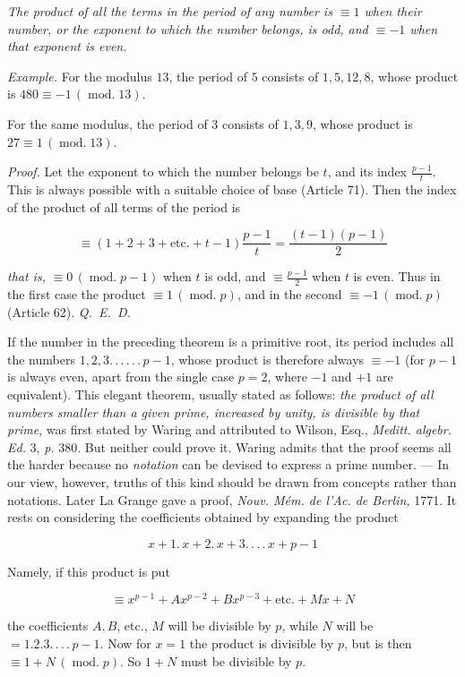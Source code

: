 \emph{The product of all the terms in the period of any number is $\equiv1$ when their number, or the exponent to which the number belongs, is odd, and $\equiv-1$ when that exponent is even.}

\emph{Example.} For the modulus $13$, the period of $5$ consists of $1,5,12,8$, whose product is $480\equiv-1\,(\operatorname{mod.}13)$.

For the same modulus, the period of $3$ consists of $1,3,9$, whose product is $27\equiv1\,(\operatorname{mod.}13)$.

\emph{Proof.} Let the exponent to which the number belongs be $t$, and its index $\frac{p-1}{t}$. This is always possible with a suitable choice of base (Article 71). Then the index of the product of all terms of the period is

\[\equiv(1+2+3+\text{etc.}+t-1)\frac{p-1}{t}=\frac{(t-1)(p-1)}{2}\]

\emph{that is,} $\equiv0\,(\operatorname{mod.}p-1)$ when $t$ is odd, and $\equiv\frac{p-1}{2}$ when $t$ is even. Thus in the first case the product $\equiv1\,(\operatorname{mod.}p)$, and in the second $\equiv-1\,(\operatorname{mod.}p)$ (Article 62). \mbox{\emph{Q. E. D.}}

If the number in the preceding theorem is a primitive root, its period includes all the numbers $1,2,3\mathpunct{.\,.\,.\,.\,.\,.}\,p-1$, whose product is therefore always $\equiv-1$ (for $p-1$ is always even, apart from the single case $p=2$, where $-1$ and $+1$ are equivalent). This elegant theorem, usually stated as follows: \emph{the product of all numbers smaller than a given prime, increased by unity, is divisible by that prime}, was first stated by Waring and attributed to Wilson, Esq., \emph{Meditt. algebr. Ed.} 3, \emph{p.} 380. But neither could prove it. Waring admits that the proof seems all the harder because no \emph{notation} can be devised to express a prime number. --- In our view, however, truths of this kind should be drawn from concepts rather than notations. Later La Grange gave a proof, \emph{Nouv. M\'em. de l'Ac. de Berlin,} 1771. It rests on considering
the coefficients obtained by expanding the product

\[x+1.\,x+2.\,x+3\mathpunct{.\,.\,.\,.}\,x+p-1\]

\noindent Namely, if this product is put

\[\equiv x^{p-1}+Ax^{p-2}+Bx^{p-3}+\text{etc.}+Mx+N\]

\noindent the coefficients $A,B$, etc., $M$ will be divisible by $p$, while $N$ will be $=1.2.3\mathpunct{.\,.\,.\,.}\,p-1$. Now for $x=1$ the product is divisible by $p$, but is then $\equiv1+N\,(\operatorname{mod.}p)$. So $1+N$ must be divisible by $p$.

